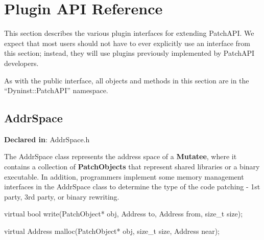 \section{Plugin API Reference}
\label{sec-plugin-api}

This section describes the various plugin interfaces for extending PatchAPI. We
expect that most users should not have to ever explicitly use an interface from
this section; instead, they will use plugins previously implemented by PatchAPI
developers.

As with the public interface, all objects and methods in this section are in the
``Dyninst::PatchAPI'' namespace.

\subsection{AddrSpace}
\label{sec-3.2.1}

\textbf{Declared in}: AddrSpace.h

The AddrSpace class represents the address space of a \textbf{Mutatee}, where it
contains a collection of \textbf{PatchObjects} that represent shared libraries
or a binary executable. In addition, programmers implement some memory
management interfaces in the AddrSpace class to determine the type of the code
patching - 1st party, 3rd party, or binary rewriting.


\begin{apient}
virtual bool write(PatchObject* obj, Address to, Address from, size_t size);
\end{apient}



\begin{apient}
virtual Address malloc(PatchObject* obj, size_t size, Address near);
\end{apient}



